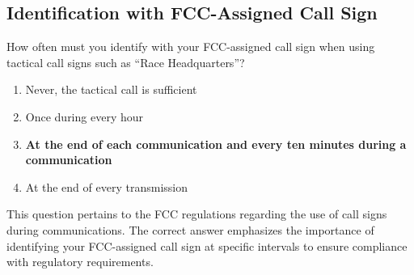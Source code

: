 \subsection{Identification with FCC-Assigned Call Sign}
\label{T1F02}

\begin{tcolorbox}[colback=gray!10!white,colframe=black!75!black,title=T1F02]
How often must you identify with your FCC-assigned call sign when using tactical call signs such as “Race Headquarters”?
\begin{enumerate}[label=\Alph*),noitemsep]
    \item Never, the tactical call is sufficient
    \item Once during every hour
    \item \textbf{At the end of each communication and every ten minutes during a communication}
    \item At the end of every transmission
\end{enumerate}
\end{tcolorbox}

This question pertains to the FCC regulations regarding the use of call signs during communications. The correct answer emphasizes the importance of identifying your FCC-assigned call sign at specific intervals to ensure compliance with regulatory requirements.